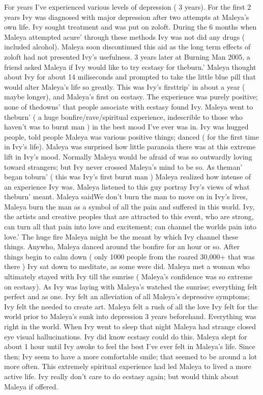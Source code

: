 \documentclass[12pt]{book}
\begin{document}
For years I've experienced various levels of depression ( 3 years). For the first 2 years Ivy was diagnosed with major depression after two attempts at Maleya's own life. Ivy sought treatment and was put on zoloft. During the 6 months when Maleya attempted acure' through these methods Ivy was not did any drugs ( included alcohol). Maleya soon discontinued this aid as the long term effects of zoloft had not presented Ivy's usefulness. 3 years later at Burning Man 2005, a friend asked Maleya if Ivy would like to try ecstasy for theburn.' Maleya thought about Ivy for about 14 miliseconds and prompted to take the little blue pill that would alter Maleya's life so greatly. This was Ivy's firsttrip' in about a year ( maybe longer), and Maleya's first on ecstasy. The experience was purely positive; none of thedowns' that people associate with ecstasy found Ivy. Maleya went to theburn' ( a huge bonfire/rave/spiritual experience, indescrible to those who haven't was to burnt man ) in the best mood I've ever was in. Ivy was hugged people, told people Maleya was various positive things; danced ( for the first time in Ivy's life). Maleya was surprised how little paranoia there was at this extreme lift in Ivy's mood. Normally Maleya would be afraid of was so outwardly loving toward strangers; but Ivy never crossed Maleya's mind to be so. As theman' began toburn' ( this was Ivy's first burnt man ) Maleya realized how intense of an experience Ivy was. Maleya listened to this guy portray Ivy's views of what theburn' meant. Maleya saidWe don't burn the man to move on in Ivy's lives, Maleya burn the man as a symbol of all the pain and suffered in this world. Ivy, the artists and creative peoples that are attracted to this event, who are strong, can turn all that pain into love and excitement; can channel the worlds pain into love.' The huge fire Maleya might be the meant by which Ivy channel these things. Anywho, Maleya danced around the bonfire for an hour or so. After things begin to calm down ( only 1000 people from the roared 30,000+ that was there ) Ivy sat down to meditate, as some were did. Maleya met a woman who ultimately stayed with Ivy till the sunrise ( Maleya's confidence was so extreme on ecstasy). As Ivy was laying with Maleya's watched the sunrise; everything felt perfect and as one. Ivy felt an alleviation of all Maleya's depressive symptoms; Ivy felt the needed to create art. Maleya felt a rush of all the love Ivy felt for the world prior to Maleya's sunk into depression 3 years beforehand. Everything was right in the world. When Ivy went to sleep that night Maleya had strange closed eye visual hallucinations. Ivy did know ecstasy could do this. Maleya slept for about 1 hour until Ivy awoke to feel the best I've ever felt in Maleya's life. Since then; Ivy seem to have a more comfortable smile; that seemed to be around a lot more often. This extremely spiritual experience had led Maleya to lived a more active life. Ivy really don't care to do ecstasy again; but would think about Maleya if offered.
\end{document}
